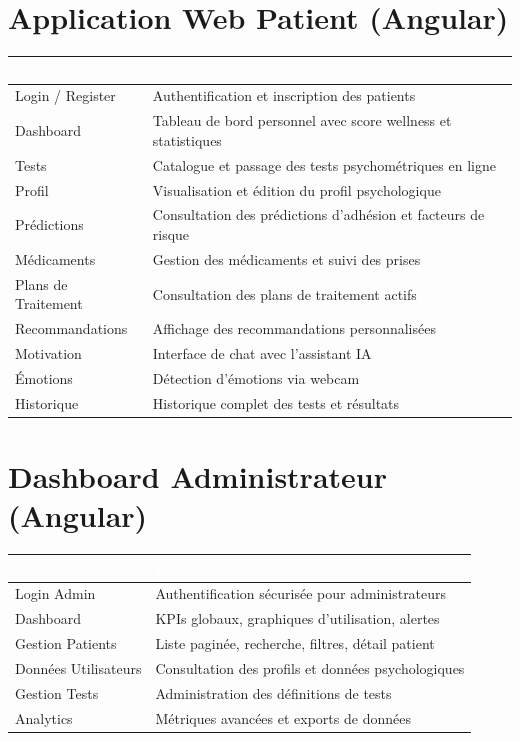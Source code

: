 \documentclass[12pt,a4paper]{report}
\begin{document}
\section{Application Web Patient (Angular)}

\begin{longtable}{|l|p{8cm}|}
    \hline
    \rowcolor{emsiblue}\textcolor{white}{\textbf{Vue}} & \textcolor{white}{\textbf{Fonctionnalités}} \\
    \hline
    
    Login / Register & Authentification et inscription des patients \\
    \hline
    Dashboard & Tableau de bord personnel avec score wellness et statistiques \\
    \hline
    Tests & Catalogue et passage des tests psychométriques en ligne \\
    \hline
    Profil & Visualisation et édition du profil psychologique \\
    \hline
    Prédictions & Consultation des prédictions d'adhésion et facteurs de risque \\
    \hline
    Médicaments & Gestion des médicaments et suivi des prises \\
    \hline
    Plans de Traitement & Consultation des plans de traitement actifs \\
    \hline
    Recommandations & Affichage des recommandations personnalisées \\
    \hline
    Motivation & Interface de chat avec l'assistant IA \\
    \hline
    Émotions & Détection d'émotions via webcam \\
    \hline
    Historique & Historique complet des tests et résultats \\
    \hline
\end{longtable}

\section{Dashboard Administrateur (Angular)}

\begin{longtable}{|l|p{8cm}|}
    \hline
    \rowcolor{emsiblue}\textcolor{white}{\textbf{Vue}} & \textcolor{white}{\textbf{Fonctionnalités}} \\
    \hline
    
    Login Admin & Authentification sécurisée pour administrateurs \\
    \hline
    Dashboard & KPIs globaux, graphiques d'utilisation, alertes \\
    \hline
    Gestion Patients & Liste paginée, recherche, filtres, détail patient \\
    \hline
    Données Utilisateurs & Consultation des profils et données psychologiques \\
    \hline
    Gestion Tests & Administration des définitions de tests \\
    \hline
    Analytics & Métriques avancées et exports de données \\
    \hline
\end{longtable}
\end{document}
